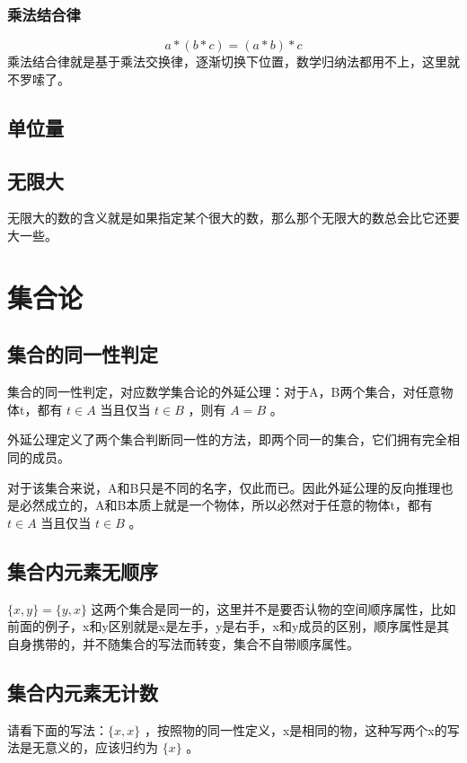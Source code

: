 \documentclass[12pt,oneside]{book}
\begin{document}
\subsection{乘法结合律}
\begin{equation}
a * (b * c) = (a * b) * c
\end{equation}
乘法结合律就是基于乘法交换律，逐渐切换下位置，数学归纳法都用不上，这里就不罗嗦了。


\section{单位量}



\section{无限大}
无限大的数的含义就是如果指定某个很大的数，那么那个无限大的数总会比它还要大一些。













\chapter{集合论}
\section{集合的同一性判定}
集合的同一性判定，对应数学集合论的外延公理：对于A，B两个集合，对任意物体t，都有 $t \in A$ 当且仅当 $t \in B$ ，则有 $A=B$ 。

外延公理定义了两个集合判断同一性的方法，即两个同一的集合，它们拥有完全相同的成员。

对于该集合来说，A和B只是不同的名字，仅此而已。因此外延公理的反向推理也是必然成立的，A和B本质上就是一个物体，所以必然对于任意的物体t，都有 $t \in A$ 当且仅当 $t \in B$ 。


\section{集合内元素无顺序}
$\{x, y\} =\{y, x\}$ 这两个集合是同一的，这里并不是要否认物的空间顺序属性，比如前面的例子，x和y区别就是x是左手，y是右手，x和y成员的区别，顺序属性是其自身携带的，并不随集合的写法而转变，集合不自带顺序属性。

\section{集合内元素无计数}
请看下面的写法：$\{x, x\}$ ，按照物的同一性定义，x是相同的物，这种写两个x的写法是无意义的，应该归约为 $\{x\}$ 。
\end{document}
